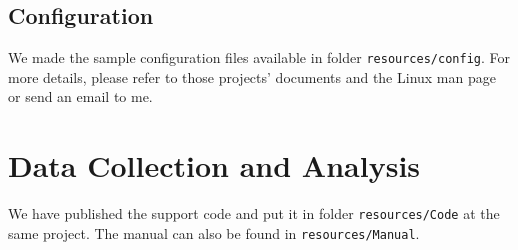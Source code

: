 \documentclass[conference]{IEEEtran}
\begin{document}
\subsection{Configuration}\label{sec:config}
We made the sample configuration files available in folder \texttt{resources/config}. For more details, please refer to those projects' documents and the Linux man page or send an email to me.

\appendix
\section{Data Collection and Analysis}
We have published the support code and put it in folder \texttt{resources/Code} at the same project. The manual can also be found in \texttt{resources/Manual}.
\end{document}
